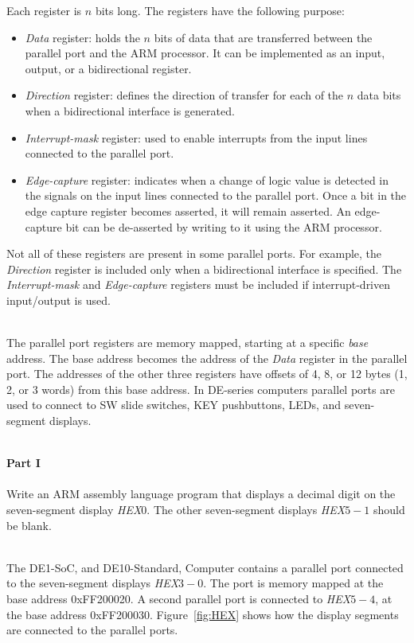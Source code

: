 \documentclass[epsfig,10pt,fullpage]{article}
\begin{document}
\noindent
Each register is $n$ bits long. The registers have the following purpose:
\begin{itemize}
\item {\it Data} register: holds the $n$ bits of data that are transferred between the parallel 
port and the ARM processor. It can be implemented as an input, output, or a bidirectional register.
\item {\it Direction} register: defines the direction of transfer for each of the $n$
data bits when a bidirectional interface is generated.
\item {\it Interrupt-mask} register: used to enable interrupts from the
input lines connected to the parallel port.
\item {\it Edge-capture} register: indicates when a change of logic value is detected in 
the signals on the input lines connected to the parallel port. Once a bit in the edge
capture register becomes asserted, it will remain asserted. An edge-capture bit can be
de-asserted by writing to it using the ARM processor.
\end{itemize}
\noindent
Not all of these registers are present in some parallel ports. For example,
the {\it Direction} register is included only when a bidirectional interface is specified.
The {\it Interrupt-mask} and {\it Edge-capture} registers must be included if
interrupt-driven input/output is used.

~\\
The parallel port registers are memory mapped, starting at a specific {\it base} address.
The base address becomes the address of the {\it Data} 
register in the parallel port. The addresses of the other three registers have offsets 
of 4, 8, or 12 bytes (1, 2, or 3 words) from this base address. In DE-series computers parallel 
ports are used to connect to SW slide switches, KEY pushbuttons, LEDs, and seven-segment displays.

~\\
\noindent
{\bf Part I}
~\\
~\\
\noindent
Write an ARM assembly language program that displays a decimal digit on the seven-segment
display {\it HEX}0. The other seven-segment 
displays {\it HEX}$5-1$ should be blank.  

~\\
\noindent
The DE1-SoC, and DE10-Standard, Computer contains a parallel port connected to the seven-segment 
displays {\it HEX}$3-0$. The port is memory mapped at the base address {\sf 0xFF200020}. A
second parallel port is connected to {\it HEX}$5-4$, at the base address {\sf 0xFF200030}. 
Figure~\ref{fig:HEX} shows how the display segments are connected to the parallel ports.  
\end{document}
